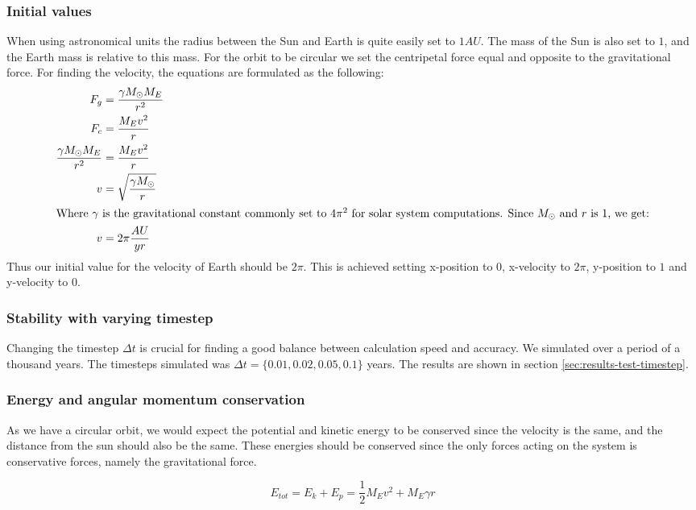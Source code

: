 \documentclass[../main.tex]{subfiles}
\begin{document}
\subsubsection{Initial values}
When using astronomical units the radius between the Sun and Earth is quite easily set to $1AU$. The mass of the Sun is also set to $1$, and the Earth mass is relative to this mass. For the orbit to be circular we set the centripetal force equal and opposite to the gravitational force. For finding the velocity, the equations are formulated as the following:
\begin{align}
  F_g &= \frac{\gamma M_\odot M_E}{r^2}\nonumber \\
  F_c &= \frac{M_E v^2}{r}\nonumber \\
  \frac{\gamma M_\odot M_E}{r^2} &= \frac{M_E v^2}{r}\nonumber \\
  v &= \sqrt{\frac{\gamma M_\odot}{r}}\nonumber \\
  \intertext{Where $\gamma$ is the gravitational constant commonly set to $4\pi^2$ for solar system computations. Since $M_\odot$ and $r$ is $1$, we get:}
  v &= 2\pi \frac{AU}{yr}
\end{align}
Thus our initial value for the velocity of Earth should be $2\pi$. This is achieved setting x-position to $0$, x-velocity to $2\pi$, y-position to $1$ and y-velocity to $0$.

\subsubsection{Stability with varying timestep}
Changing the timestep $\Delta t$ is crucial for finding a good balance between calculation speed and accuracy. We simulated over a period of a thousand years. The timesteps simulated was $\Delta t = \{0.01, 0.02, 0.05, 0.1\}$ years. The results are shown in section \ref{sec:results-test-timestep}.
\subsubsection{Energy and angular momentum conservation}
As we have a circular orbit, we would expect the potential and kinetic energy to be conserved since the velocity is the same, and the distance from the sun should also be the same. These energies should be conserved since the only forces acting on the system is conservative forces, namely the gravitational force.

$$E_{tot} = E_k + E_p = \frac{1}{2} M_E v^2 + M_E \gamma r$$
\end{document}
